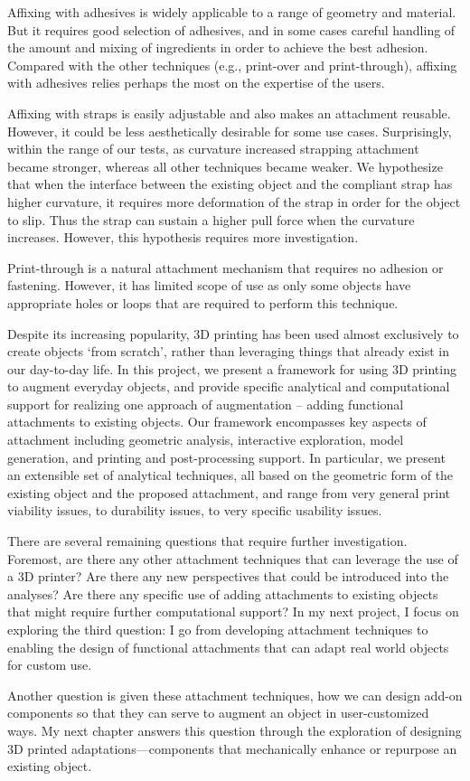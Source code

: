 Affixing with adhesives is widely applicable to a range of geometry and material. But it requires good selection of adhesives, and in some cases careful handling of the amount and mixing of ingredients in order to achieve the best adhesion. Compared with the other techniques (e.g., print-over and print-through), affixing with adhesives relies perhaps the most on the expertise of the users.

Affixing with straps is easily adjustable and also makes an attachment reusable. However, it could be less aesthetically desirable for some use cases. Surprisingly, within the range of our tests, as curvature increased strapping attachment became stronger, whereas all other techniques became weaker. We hypothesize that when the interface between the existing object and the compliant strap has higher curvature, it requires more deformation of the strap in order for the object to slip. Thus the strap can sustain a higher pull force when the curvature increases. However, this hypothesis requires more investigation.

Print-through is a natural attachment mechanism that requires no adhesion or fastening. However, it has limited scope of use as only some objects have appropriate holes or loops that are required to perform this technique.

Despite its increasing popularity, 3D printing has been used almost exclusively to create objects `from scratch', rather than leveraging things that already exist in our day-to-day life. In this project, we present a framework for using 3D printing to augment everyday objects, and provide specific analytical and computational support for realizing one approach of augmentation – adding functional attachments to existing objects. Our framework encompasses key aspects of attachment including geometric analysis, interactive exploration, model generation, and printing and post-processing support. In particular, we present an extensible set of analytical techniques, all based on the geometric form of the existing object and the proposed attachment, and range from very general print viability issues, to durability issues, to very specific usability issues.

There are several remaining questions that require further investigation. Foremost, are there any other attachment techniques that can leverage the use of a 3D printer? Are there any new perspectives that could be introduced into the analyses? Are there any specific use of adding attachments to existing objects that might require further computational support? In my next project, I focus on exploring the third question: I go from developing attachment techniques to enabling the design of functional attachments that can adapt real world objects for custom use.

Another question is given these attachment techniques, how we can design add-on components so that they can serve to augment an object in user-customized ways. My next chapter answers this question through the exploration of designing 3D printed adaptations---components that mechanically enhance or repurpose an existing object.
